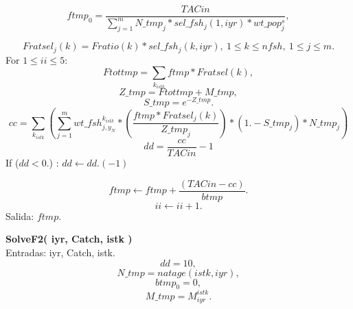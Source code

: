 \documentclass{article}
\begin{document}
\begin{equation}
    ftmp_0=\dfrac{TACin}{\sum_{j=1}^mN\_tmp_j*sel\_fsh_j(1,iyr)*wt\_pop^s_j},
\end{equation}

\begin{equation}
    Fratsel_j(k)=Fratio(k)*sel\_fsh_j(k,iyr), \ 1\leq k \leq nfsh, \ 1 \leq j \leq m.
\end{equation}
For $1 \leq ii \leq 5$:
\begin{equation}
    Ftottmp= \sum_{k_{istk}}ftmp*Fratsel(k),
\end{equation}
\begin{equation}
    Z\_tmp=Ftottmp+M\_tmp,
\end{equation}
\begin{equation}
    S\_tmp=e^{-Z\_tmp}.
\end{equation}
\begin{equation}
    cc=\sum_{k_{istk}}\left(\sum_{j=1}^mwt\_fsh^{k_{istk}}_{j,y_N}*\left(\dfrac{ftmp*Fratsel_j(k)}{Z\_tmp_j}\right)*(1.-S\_tmp_j)*N\_tmp_j\right)
\end{equation}
\begin{equation}
    dd=\dfrac{cc}{TACin}-1
\end{equation}
If ($dd<0.$) :   $dd \leftarrow dd . (-1)$

\begin{equation}
    ftmp \leftarrow ftmp + \dfrac{(TACin-cc)}{btmp}.
\end{equation}
\begin{equation}
    ii \leftarrow ii +1.
\end{equation}
Salida: $ftmp$.






\textbf{SolveF2( iyr, Catch, istk )}\\
Entradas: iyr, Catch, istk.
\begin{equation}
    dd=10,
\end{equation}
\begin{equation}
    N\_tmp = natage(istk,iyr),
\end{equation}
\begin{equation}
    btmp_0=0,
\end{equation}
\begin{equation}
    M\_tmp=M^{istk}_{iyr}.
\end{equation}
\end{document}
